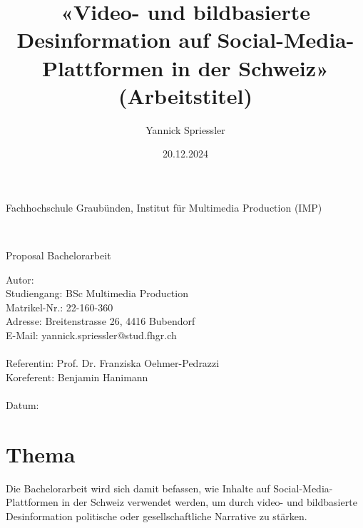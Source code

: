 \documentclass[12pt,a4paper]{article}        %
\title{«Video- und bildbasierte Desinformation auf Social-Media-Plattformen in der Schweiz» (Arbeitstitel)}        %
\author{Yannick Spriessler}     %
\date{20.12.2024}     %
\begin{document}
\begin{titlingpage} %
  \begin{center}
    \begin{large}
      Fachhochschule Graubünden, Institut für Multimedia Production (IMP)\\ %
    \end{large}
    \vspace{2cm} %
    \begin{LARGE}
      \textbf{\thetitle} \\
    \end{LARGE}
    \vspace{1cm}
    \begin{large}
      Proposal Bachelorarbeit\\
    \end{large}
    \vspace{5cm} %
    Autor: \theauthor \\
    Studiengang: BSc Multimedia Production \\
    Matrikel-Nr.: 22-160-360 \\
    Adresse: Breitenstrasse 26, 4416 Bubendorf \\
    E-Mail: yannick.spriessler@stud.fhgr.ch \\ \\
    Referentin: Prof. Dr. Franziska Oehmer-Pedrazzi \\
    Koreferent: Benjamin Hanimann \\ \\
    Datum: \thedate
  \end{center}
\end{titlingpage}
\thispagestyle{empty}
\setcounter{page}{0}    %
\tableofcontents        %
\pagebreak

\section{Thema}
Die Bachelorarbeit wird sich damit befassen, wie Inhalte auf Social-Media-Plattformen in der Schweiz verwendet werden, um durch video- und bildbasierte Desinformation politische oder gesellschaftliche Narrative zu stärken. \\
\end{document}
